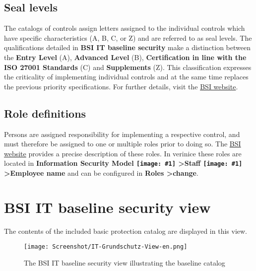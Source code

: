 \documentclass[a4paper,10pt]{book}
\newcommand{\icon}[1]{\texttt{[image: \#1]}}
\begin{document}
\subsection{Seal levels}
The catalogs of controls assign letters assigned to the individual controls which have specific characteristics
(A, B, C, or Z) and are referred to as seal levels. The qualifications detailed in \textbf{BSI IT baseline security}
make a distinction between the \textbf{Entry Level} (A), \textbf{Advanced Level} (B),
\textbf{Certification in line with the ISO 27001 Standards} (C) and \textbf{Supplements} (Z). This classification expresses the criticality
of implementing individual controls and at the same time replaces the previous priority specifications.
For further details, visit the \href{https://www.bsi.bund.de/cln_156/DE/Themen/weitereThemen/ITGrundschutzSchulung/NeuesimITGrundschutz/LebenszyklusundSiegelstufen/lebenszyklusundsiegelstufen_node.html}{BSI website}.

\subsection{Role definitions}
Persons are assigned responsibility for implementing a respective control, and must therefore be assigned to one or multiple
roles prior to doing so. The \href{https://www.bsi.bund.de/cln_156/DE/Themen/weitereThemen/ITGrundschutzKataloge/Inhalt/Rollendefinitionen/rollendefinitionen_node.html}{BSI website}
provides a precise description of these roles. In verinice these roles are located in
\textbf{Information Security Model \icon{Icon/GS_Modell.png} \textgreater Staff \icon{Icon/Mitarbeiter.png} \textgreater Employee name}
and can be configured in \textbf{Roles \textgreater change}.

\section{BSI IT baseline security view}
The contents of the included basic protection catalog are displayed in this view.
\newline
\begin{figure}[htb!]
  \centering
  \texttt{[image: Screenshot/IT-Grundschutz-View-en.png]}
  \caption{\label{The BSI IT baseline security view illustrating the baseline catalog} The BSI IT baseline security view illustrating the baseline catalog}
\end{figure}
\end{document}

